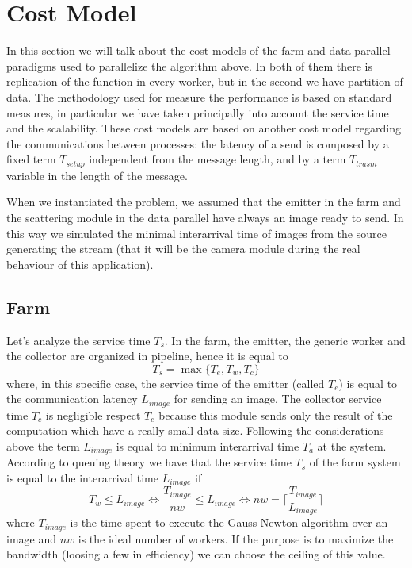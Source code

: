 \section{Cost Model}

In this section we will talk about the cost models of the farm and data parallel paradigms used to parallelize the algorithm above. In both of them there is replication of the function in every worker, but in the second we have partition of data. The methodology used for measure the performance is based on standard measures, in particular we have taken principally into account the service time and the scalability. These cost models are based on another cost model regarding the communications between processes: the latency of a send is composed by a fixed term $T_{setup}$ independent from the message length, and by a term $T_{trasm}$ variable in the length of the message.

When we instantiated the problem, we assumed that the emitter in the farm and the scattering module in the data parallel have always an image ready to send. In this way we simulated the minimal interarrival time of images from the source generating the stream (that it will be the camera module during the real behaviour of this application).

\subsection{Farm}

Let's analyze the service time $T_{s}$. 
In the farm, the emitter, the generic worker and the collector are organized in pipeline, hence it is equal to
\[
T_{s} = \max \lbrace T_{e}, T_{w}, T_{c}\rbrace
\]
where, in this specific case, the service time of the emitter (called $T_{e}$) is equal to the communication latency $L_{image}$ for sending an image.
The collector service time $T_{c}$ is negligible respect $T_{e}$ because this module sends only the result of the computation which have a really small data size.
Following the considerations above the term $L_{image}$ is equal to minimum interarrival time $T_{a}$ at the system. 
According to queuing theory we have that the service time $T_{s}$ of the farm system is equal to the interarrival time $L_{image}$ if
\[
T_{w} \leq L_{image} \Leftrightarrow \frac{T_{image}}{nw} \leq L_{image} \Leftrightarrow nw = \big \lceil \frac{T_{image}}{L_{image}} \big \rceil
\]
where $T_{image}$ is the time spent to execute the Gauss-Newton algorithm over an image and $nw$ is the ideal number of workers. If the purpose is to maximize the bandwidth (loosing a few in efficiency) we can choose the ceiling of this value.

